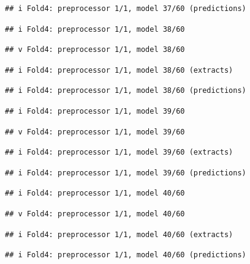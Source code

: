 \documentclass[
]{article}
\begin{document}
\begin{verbatim}
## i Fold4: preprocessor 1/1, model 37/60 (predictions)
\end{verbatim}

\begin{verbatim}
## i Fold4: preprocessor 1/1, model 38/60
\end{verbatim}

\begin{verbatim}
## v Fold4: preprocessor 1/1, model 38/60
\end{verbatim}

\begin{verbatim}
## i Fold4: preprocessor 1/1, model 38/60 (extracts)
\end{verbatim}

\begin{verbatim}
## i Fold4: preprocessor 1/1, model 38/60 (predictions)
\end{verbatim}

\begin{verbatim}
## i Fold4: preprocessor 1/1, model 39/60
\end{verbatim}

\begin{verbatim}
## v Fold4: preprocessor 1/1, model 39/60
\end{verbatim}

\begin{verbatim}
## i Fold4: preprocessor 1/1, model 39/60 (extracts)
\end{verbatim}

\begin{verbatim}
## i Fold4: preprocessor 1/1, model 39/60 (predictions)
\end{verbatim}

\begin{verbatim}
## i Fold4: preprocessor 1/1, model 40/60
\end{verbatim}

\begin{verbatim}
## v Fold4: preprocessor 1/1, model 40/60
\end{verbatim}

\begin{verbatim}
## i Fold4: preprocessor 1/1, model 40/60 (extracts)
\end{verbatim}

\begin{verbatim}
## i Fold4: preprocessor 1/1, model 40/60 (predictions)
\end{verbatim}
\end{document}
